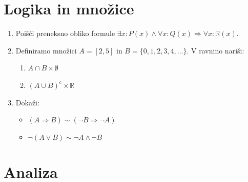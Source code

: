 \documentclass[a4paper,12pt]{article}
\begin{document}

\section*{Logika in množice}

\begin{enumerate}
\item
Poišči preneksno obliko formule \(\exists x:P(x) \land \forall x:Q(x) \Rightarrow \forall x : \mathbb{R}(x).\)

\item
Definiramo množici \(A = [2, 5]\) in  \(B = \{0,1,2,3,4,\ldots\}\).
V ravnino nariši:
\begin{enumerate}
\item \(A \cap B \times \emptyset\)
\item \((A \cup B)^c \times \mathbb{R}\)
\end{enumerate}

\item
Dokaži:
\begin{itemize}
\item \((A\Rightarrow B)\sim (\neg B\Rightarrow \neg A)\)
\item \(\neg (A \lor B)\sim \neg A \land \neg B\)
\end{itemize}
\end{enumerate}

\section*{Analiza}
\end{document}
